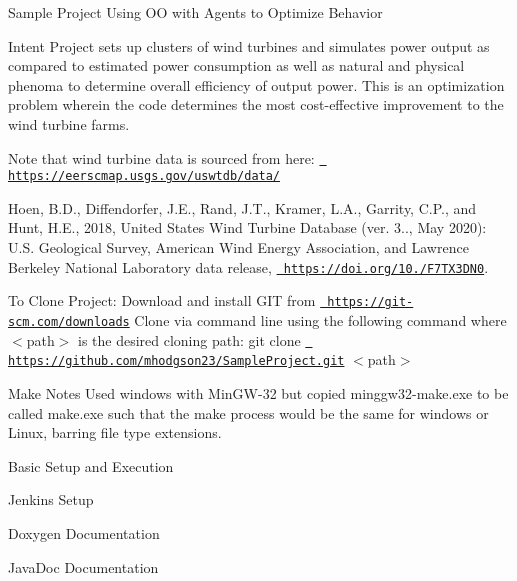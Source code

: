 Sample Project Using OO with Agents to Optimize Behavior

Intent Project sets up clusters of wind turbines and simulates power output as compared to estimated power consumption as well as natural and physical phenoma to determine overall efficiency of output power. This is an optimization problem wherein the code determines the most cost-\/effective improvement to the wind turbine farms.

Note that wind turbine data is sourced from here\+: \href{https://eerscmap.usgs.gov/uswtdb/data/}{\texttt{ https\+://eerscmap.\+usgs.\+gov/uswtdb/data/}}

Hoen, B.\+D., Diffendorfer, J.\+E., Rand, J.\+T., Kramer, L.\+A., Garrity, C.\+P., and Hunt, H.\+E., 2018, United States Wind Turbine Database (ver. 3.., May 2020)\+: U.\+S. Geological Survey, American Wind Energy Association, and Lawrence Berkeley National Laboratory data release, \href{https://doi.org/10.5066/F7TX3DN0}{\texttt{ https\+://doi.\+org/10./\+F7\+T\+X3\+D\+N0}}.

To Clone Project\+: Download and install G\+IT from \href{https://git-scm.com/downloads}{\texttt{ https\+://git-\/scm.\+com/downloads}} Clone via command line using the following command where $<$path$>$ is the desired cloning path\+: git clone \href{https://github.com/mhodgson23/SampleProject.git}{\texttt{ https\+://github.\+com/mhodgson23/\+Sample\+Project.\+git}} $<$path$>$

Make Notes Used windows with Min\+G\+W-\/32 but copied minggw32-\/make.\+exe to be called make.\+exe such that the make process would be the same for windows or Linux, barring file type extensions.

Basic Setup and Execution

Jenkins Setup

Doxygen Documentation

Java\+Doc Documentation 